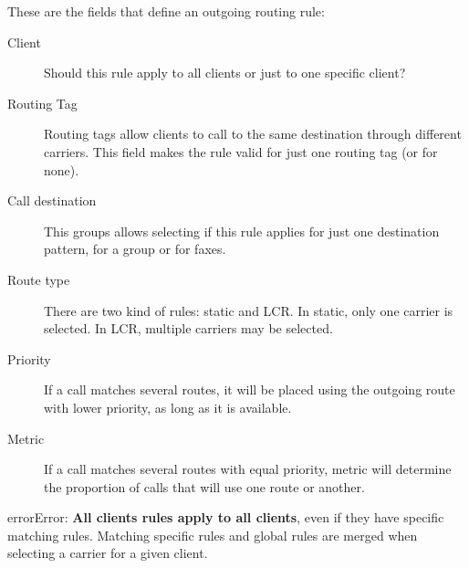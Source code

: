 \documentclass[letterpaper,10pt,english]{sphinxmanual}
\begin{document}
These are the fields that define an outgoing routing rule:
\begin{description}
\item[{Client}] \leavevmode{}\label{administration_portal/brand/routing/outgoing_routings:term-client}
Should this rule apply to all clients or just to one specific client?

\item[{Routing Tag}] \leavevmode{}\label{administration_portal/brand/routing/outgoing_routings:term-routing-tag}
Routing tags allow clients to call to the same destination through different carriers. This field makes the
rule valid for just one routing tag (or for none).

\item[{Call destination}] \leavevmode{}\label{administration_portal/brand/routing/outgoing_routings:term-call-destination}
This groups allows selecting if this rule applies for just one destination pattern, for a group or for faxes.

\item[{Route type}] \leavevmode{}\label{administration_portal/brand/routing/outgoing_routings:term-route-type}
There are two kind of rules: static and LCR. In static, only one carrier is selected. In LCR, multiple carriers
may be selected.

\item[{Priority}] \leavevmode{}\label{administration_portal/brand/routing/outgoing_routings:term-priority}
If a call matches several routes, it will be placed using the outgoing
route with lower priority, as long as it is available.

\item[{Metric}] \leavevmode{}\label{administration_portal/brand/routing/outgoing_routings:term-metric}
If a call matches several routes with equal priority, metric will determine
the proportion of calls that will use one route or another.

\end{description}

\begin{notice}{error}{Error:}
\textbf{All clients rules apply to all clients}, even if they have specific matching rules. Matching specific rules and
global rules are merged when selecting a carrier for a given client.
\end{notice}
\end{document}
